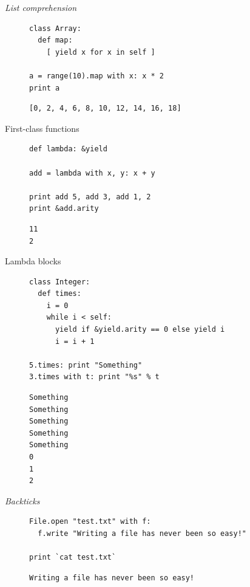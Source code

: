 \documentclass{beamer}
\begin{document}
\begin{frame}[fragile]{\emph{List comprehension}}
\begin{figure}[h!]
\begin{lstlisting}[language=hal]
class Array:
  def map:
    [ yield x for x in self ]

a = range(10).map with x: x * 2
print a
\end{lstlisting}
\begin{lstlisting}[language=output]
[0, 2, 4, 6, 8, 10, 12, 14, 16, 18]
\end{lstlisting}
\label{list_comprehension}
\end{figure}
\end{frame}
\begin{frame}[fragile]{First-class functions}
\begin{figure}[h!]
\begin{lstlisting}[language=hal]
def lambda: &yield

add = lambda with x, y: x + y

print add 5, add 3, add 1, 2
print &add.arity
\end{lstlisting}
\begin{lstlisting}[language=output]
11
2
\end{lstlisting}
\label{first_class_methods}
\end{figure}
\end{frame}
\begin{frame}[fragile]{Lambda blocks}
\begin{figure}[h!]
\begin{lstlisting}[language=hal]
class Integer:
  def times:
    i = 0
    while i < self:
      yield if &yield.arity == 0 else yield i
      i = i + 1

5.times: print "Something"
3.times with t: print "%s" % t
\end{lstlisting}
\begin{lstlisting}[language=output]
Something
Something
Something
Something
Something
0
1
2
\end{lstlisting}
\label{blocks_times}
\end{figure}
\end{frame}
\begin{frame}[fragile]{\emph{Backticks}}
\begin{figure}[h!]
\begin{lstlisting}[language=hal]
File.open "test.txt" with f:
  f.write "Writing a file has never been so easy!"

print `cat test.txt`
\end{lstlisting}
\begin{lstlisting}[language=output]
Writing a file has never been so easy!
\end{lstlisting}
\label{backticks}
\end{figure}
\end{frame}
\end{document}
